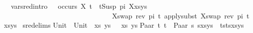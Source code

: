 \begin{isabellebody}
\ \ var{\isacharunderscore}{\kern0pt}{}{\isacharunderscore}{\kern0pt}sred{\isacharbrackleft}{\kern0pt}intro{\isacharbang}{\kern0pt}{\isacharbrackright}{\kern0pt}{\isacharcolon}{\kern0pt}\ \ \ {\isachardoublequoteopen}{\isasymnot}{\isacharparenleft}{\kern0pt}occurs\ X\ t{\isacharparenright}{\kern0pt}\ {\isasymLongrightarrow}\ {\isacharparenleft}{\kern0pt}{\isacharparenleft}{\kern0pt}t{\isasymapprox}{\isacharquery}{\kern0pt}Susp\ pi\ X{\isacharparenright}{\kern0pt}{\isacharhash}{\kern0pt}xs{\isacharcomma}{\kern0pt}ys{\isacharparenright}{\kern0pt}\ \isanewline
\ \ \ \ \ \ \ \ \ \ \ \ \ \ \ \ \ \ \ \ \ \ \ \ \ \ \ \ \ \ \ {\isasymturnstile}{\isacharbrackleft}{\kern0pt}{\isacharparenleft}{\kern0pt}X{\isacharcomma}{\kern0pt}swap\ {\isacharparenleft}{\kern0pt}rev\ pi{\isacharparenright}{\kern0pt}\ t{\isacharparenright}{\kern0pt}{\isacharbrackright}{\kern0pt}{\isasymleadsto}\ apply{\isacharunderscore}{\kern0pt}subst\ {\isacharbrackleft}{\kern0pt}{\isacharparenleft}{\kern0pt}X{\isacharcomma}{\kern0pt}swap\ {\isacharparenleft}{\kern0pt}rev\ pi{\isacharparenright}{\kern0pt}\ t{\isacharparenright}{\kern0pt}{\isacharbrackright}{\kern0pt}\ {\isacharparenleft}{\kern0pt}xs{\isacharcomma}{\kern0pt}ys{\isacharparenright}{\kern0pt}{\isachardoublequoteclose}\isanewline
\isanewline
{}\isamarkupfalse%
\ s{\isacharunderscore}{\kern0pt}red{\isacharunderscore}{\kern0pt}elims{\isacharcolon}{\kern0pt}\isanewline
{\isachardoublequoteopen}{\isacharparenleft}{\kern0pt}{\isacharparenleft}{\kern0pt}Unit\ {\isasymapprox}{\isacharquery}{\kern0pt}\ Unit{\isacharparenright}{\kern0pt}\ {\isacharhash}{\kern0pt}\ xs{\isacharcomma}{\kern0pt}\ ys{\isacharparenright}{\kern0pt}\ {\isasymturnstile}{\isacharbrackleft}{\kern0pt}{\isacharbrackright}{\kern0pt}\ {\isasymleadsto}\ {\isacharparenleft}{\kern0pt}xs{\isacharcomma}{\kern0pt}\ ys{\isacharparenright}{\kern0pt}{\isachardoublequoteclose}\isanewline
{\isachardoublequoteopen}{\isacharparenleft}{\kern0pt}{\isacharparenleft}{\kern0pt}Paar\ t{}\ t{}\ {\isasymapprox}{\isacharquery}{\kern0pt}\ Paar\ s{}\ s{}{\isacharparenright}{\kern0pt}{\isacharhash}{\kern0pt}xs{\isacharcomma}{\kern0pt}ys{\isacharparenright}{\kern0pt}\ {\isasymturnstile}{\isacharbrackleft}{\kern0pt}{\isacharbrackright}{\kern0pt}{\isasymleadsto}\ {\isacharparenleft}{\kern0pt}{\isacharparenleft}{\kern0pt}t{}{\isasymapprox}{\isacharquery}{\kern0pt}s{}{\isacharparenright}{\kern0pt}{\isacharhash}{\kern0pt}{\isacharparenleft}{\kern0pt}t{}{\isasymapprox}{\isacharquery}{\kern0pt}s{}{\isacharparenright}{\kern0pt}{\isacharhash}{\kern0pt}xs{\isacharcomma}{\kern0pt}ys{\isacharparenright}{\kern0pt}{\isachardoublequoteclose}\isanewline

\end{isabellebody}
